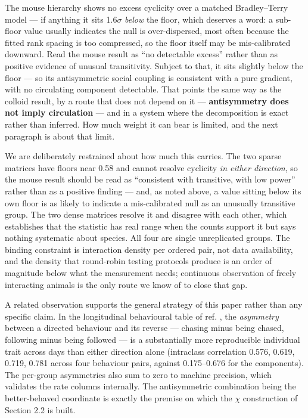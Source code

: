 \documentclass[aps,pre,preprint,superscriptaddress,nofootinbib,longbibliography]{revtex4-2}
\begin{document}
The mouse hierarchy shows no excess cyclicity over a matched Bradley--Terry model --- if anything it sits 1.6$\sigma$ \emph{below} the floor, which deserves a word: a sub-floor value usually indicates the null is over-dispersed, most often because the fitted rank spacing is too compressed, so the floor itself may be mis-calibrated downward. Read the mouse result as ``no detectable excess'' rather than as positive evidence of unusual transitivity. Subject to that, it sits slightly below the floor --- so its antisymmetric social coupling is consistent with a pure gradient, with no circulating component detectable. That points the same way as the colloid result, by a route that does not depend on it --- \textbf{antisymmetry does not imply circulation} --- and in a system where the decomposition is exact rather than inferred. How much weight it can bear is limited, and the next paragraph is about that limit.

We are deliberately restrained about how much this carries. The two sparse matrices have floors near 0.58 and cannot resolve cyclicity \emph{in either direction}, so the mouse result should be read as ``consistent with transitive, with low power'' rather than as a positive finding --- and, as noted above, a value sitting below its own floor is as likely to indicate a mis-calibrated null as an unusually transitive group. The two dense matrices resolve it and disagree with each other, which establishes that the statistic has real range when the counts support it but says nothing systematic about species. All four are single unreplicated groups. The binding constraint is interaction density per ordered pair, not data availability, and the density that round-robin testing protocols produce is an order of magnitude below what the measurement needs; continuous observation of freely interacting animals is the only route we know of to close that gap.

A related observation supports the general strategy of this paper rather than any specific claim. In the longitudinal behavioural table of ref. \cite{r27}, the \emph{asymmetry} between a directed behaviour and its reverse --- chasing minus being chased, following minus being followed --- is a substantially more reproducible individual trait across days than either direction alone (intraclass correlation 0.576, 0.619, 0.719, 0.781 across four behaviour pairs, against 0.175--0.676 for the components). The per-group asymmetries also sum to zero to machine precision, which validates the rate columns internally. The antisymmetric combination being the better-behaved coordinate is exactly the premise on which the $\chi$ construction of Section 2.2 is built.
\end{document}
